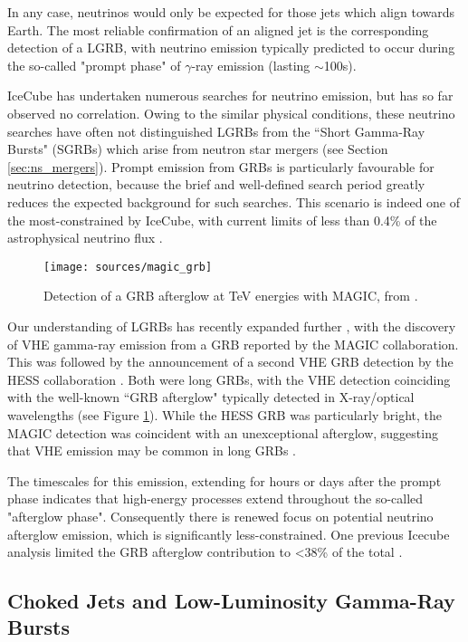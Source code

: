 In any case, neutrinos would only be expected for those jets which align towards Earth. The most reliable confirmation of an aligned jet is the corresponding detection of a LGRB, with neutrino emission typically predicted to occur during the so-called "prompt phase" of $\gamma$-ray emission (lasting $\sim$100s). 

IceCube has undertaken numerous searches for neutrino emission, but has so far observed no correlation. Owing to the similar physical conditions, these neutrino searches have often not distinguished LGRBs from the ``Short Gamma-Ray Bursts" (SGRBs) which arise from neutron star mergers (see Section \ref{sec:ns_mergers}). Prompt emission from GRBs is particularly favourable for neutrino detection, because the brief and well-defined search period greatly reduces the expected background for such searches. This scenario is indeed one of the most-constrained by IceCube, with current limits of less than 0.4\% of the astrophysical neutrino flux . 

\begin{figure}[!ht]
	\centering \texttt{[image: sources/magic\_grb]}
	\caption{Detection of a GRB afterglow at TeV energies with MAGIC, from \cite{magic_grb_19}.}
	\label{fig:magic_grb}
\end{figure}

Our understanding of LGRBs has recently expanded further , with the discovery of VHE gamma-ray emission from a GRB reported by the MAGIC collaboration. This was followed by the announcement of a second VHE GRB detection by the HESS collaboration . Both were long GRBs, with the VHE detection coinciding with the well-known ``GRB afterglow" typically detected in X-ray/optical wavelengths (see Figure \ref{fig:magic_grb}). While the HESS GRB was particularly bright, the MAGIC detection was coincident with an unexceptional afterglow, suggesting that VHE emission may be common in long GRBs .

The timescales for this emission, extending for hours or days after the prompt phase indicates that high-energy processes extend throughout the so-called "afterglow phase". Consequently there is renewed focus on potential neutrino afterglow emission, which is significantly less-constrained. One previous Icecube analysis limited the GRB afterglow contribution to <38\% of the total .

\subsection*{Choked Jets and Low-Luminosity Gamma-Ray Bursts}

